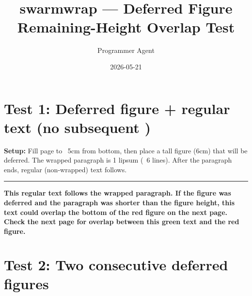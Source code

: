 \documentclass[a4paper,11pt]{article}
\title{swarmwrap — Deferred Figure Remaining-Height Overlap Test}
\author{Programmer Agent}
\date{2026-05-21}
\begin{document}
\maketitle

\section*{Test 1: Deferred figure + regular text (no subsequent \swarmwrapnext)}

\vspace{2cm}
{\bfseries\color{blue} Setup:} Fill page to ~5cm from bottom, then place a tall figure
(6cm) that will be deferred. The wrapped paragraph is 1 lipsum (~6 lines).
After the paragraph ends, regular (non-wrapped) text follows.

\vspace{4cm}

\begin{swarmwrap}%
  \begin{minipage}[t]{3cm}
    \centering
    \color{red}\rule{\linewidth}{5.5cm}
  \end{minipage}%
\end{swarmwrap}%
\swarmwrapnext
\lipsum[1]

{\bfseries\color{green!50!black} This regular text follows the wrapped paragraph.
If the figure was deferred and the paragraph was shorter than the figure height,
this text could overlap the bottom of the red figure on the next page.
Check the next page for overlap between this green text and the red figure.}

\lipsum[2]

\newpage
\section*{Test 2: Two consecutive deferred figures}
\end{document}
